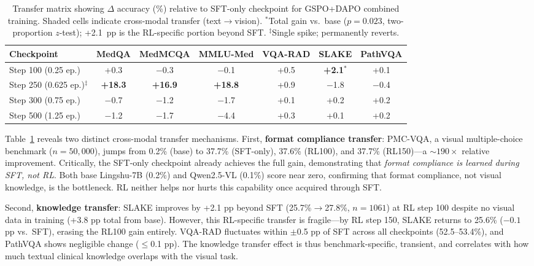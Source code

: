 \documentclass{article}
\begin{document}
\begin{table}[t]
\centering
\caption{Transfer matrix showing $\Delta$ accuracy (\%) relative to SFT-only checkpoint for GSPO+DAPO combined training. Shaded cells indicate cross-modal transfer (text$\to$vision). $^*$Total gain vs.\ base ($p{=}0.023$, two-proportion $z$-test); +2.1~pp is the RL-specific portion beyond SFT. $^\ddagger$Single spike; permanently reverts.}
\label{tab:transfer}
\begin{tabular}{lcccccc}
\toprule
\textbf{Checkpoint} & MedQA & MedMCQA & MMLU-Med & VQA-RAD & SLAKE & PathVQA \\
\midrule
Step 100 (0.25 ep.) & +0.3 & $-$0.3 & $-$0.1 & \cellcolor{gray!20}+0.5 & \cellcolor{gray!20}\textbf{+2.1}$^*$ & \cellcolor{gray!20}+0.1 \\
Step 250 (0.625 ep.)$^\ddagger$ & \textbf{+18.3} & \textbf{+16.9} & \textbf{+18.8} & \cellcolor{gray!20}+0.9 & \cellcolor{gray!20}$-$1.8 & \cellcolor{gray!20}$-$0.4 \\
Step 300 (0.75 ep.) & $-$0.7 & $-$1.2 & $-$1.7 & \cellcolor{gray!20}+0.1 & \cellcolor{gray!20}+0.2 & \cellcolor{gray!20}+0.2 \\
Step 500 (1.25 ep.) & $-$1.2 & $-$1.7 & $-$4.4 & \cellcolor{gray!20}+0.3 & \cellcolor{gray!20}+0.1 & \cellcolor{gray!20}+0.2 \\
\bottomrule
\end{tabular}
\end{table}

Table~\ref{tab:transfer} reveals two distinct cross-modal transfer mechanisms. First, \textbf{format compliance transfer}: PMC-VQA, a visual multiple-choice benchmark ($n{=}50{,}000$), jumps from 0.2\% (base) to 37.7\% (SFT-only), 37.6\% (RL100), and 37.7\% (RL150)---a ${\sim}190{\times}$ relative improvement. Critically, the SFT-only checkpoint already achieves the full gain, demonstrating that \emph{format compliance is learned during SFT, not RL}. Both base Lingshu-7B (0.2\%) and Qwen2.5-VL (0.1\%) score near zero, confirming that format compliance, not visual knowledge, is the bottleneck. RL neither helps nor hurts this capability once acquired through SFT.

Second, \textbf{knowledge transfer}: SLAKE improves by +2.1 pp beyond SFT (25.7\%$\to$27.8\%, $n{=}1061$) at RL step 100 despite no visual data in training (+3.8 pp total from base). However, this RL-specific transfer is fragile---by RL step 150, SLAKE returns to 25.6\% ($-0.1$ pp vs.\ SFT), erasing the RL100 gain entirely. VQA-RAD fluctuates within $\pm$0.5 pp of SFT across all checkpoints (52.5--53.4\%), and PathVQA shows negligible change ($\leq$0.1 pp). The knowledge transfer effect is thus benchmark-specific, transient, and correlates with how much textual clinical knowledge overlaps with the visual task.
\end{document}
